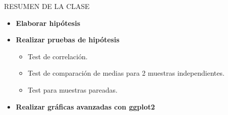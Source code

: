 \documentclass[
  ignorenonframetext,
]{beamer}
\providecommand{\tightlist}{%
  \setlength{\itemsep}{0pt}\setlength{\parskip}{0pt}}
\begin{document}
\begin{frame}{RESUMEN DE LA CLASE}
\protect\hypertarget{resumen-de-la-clase}{}
\begin{itemize}
\item
  \textbf{Elaborar hipótesis}
\item
  \textbf{Realizar pruebas de hipótesis}

  \begin{itemize}
  \tightlist
  \item
    Test de correlación.\\
  \item
    Test de comparación de medias para 2 muestras independientes.
  \item
    Test para muestras pareadas.
  \end{itemize}
\item
  \textbf{Realizar gráficas avanzadas con ggplot2}
\end{itemize}
\end{frame}
\end{document}
